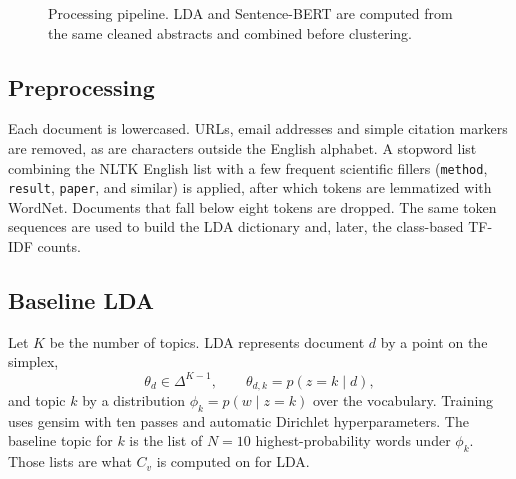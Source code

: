 \documentclass[11pt,a4paper]{article}
\begin{document}
\begin{figure}[htbp]
\centering
{}
\caption{Processing pipeline. LDA and Sentence-BERT are computed from the same cleaned abstracts and combined before clustering.}
\label{fig:pipeline}
\end{figure}

\subsection{Preprocessing}
Each document is lowercased. URLs, email addresses and simple citation markers are removed, as are characters outside the English alphabet. A stopword list combining the NLTK English list with a few frequent scientific fillers (\texttt{method}, \texttt{result}, \texttt{paper}, and similar) is applied, after which tokens are lemmatized with WordNet. Documents that fall below eight tokens are dropped. The same token sequences are used to build the LDA dictionary and, later, the class-based TF-IDF counts.

\subsection{Baseline LDA}
Let $K$ be the number of topics. LDA represents document $d$ by a point on the simplex,
\begin{equation}
  \theta_d \in \Delta^{K-1}, \qquad \theta_{d,k} = p(z=k\mid d),
\end{equation}
and topic $k$ by a distribution $\phi_k = p(w\mid z=k)$ over the vocabulary. Training uses gensim with ten passes and automatic Dirichlet hyperparameters. The baseline topic for $k$ is the list of $N=10$ highest-probability words under $\phi_k$. Those lists are what $C_v$ is computed on for LDA.
\end{document}
